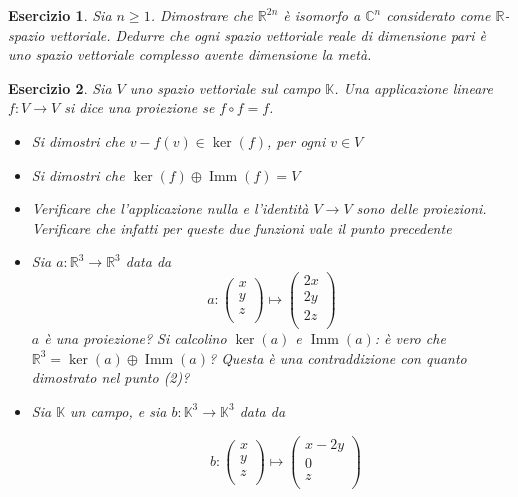 \documentclass{article}
\newtheorem{es}{Esercizio}
\begin{document}
{\begin{es}
    Sia $n\geq 1$. Dimostrare che $\mathbb{R}^{2n}$ è isomorfo a $\mathbb{C}^n$ considerato come $\mathbb{R}$-spazio vettoriale. Dedurre che ogni spazio vettoriale reale di dimensione pari è uno spazio vettoriale complesso avente dimensione la metà.
\end{es}


\begin{es}
    
    Sia $V$ uno spazio vettoriale sul campo $\mathbb{K}$. Una applicazione lineare $f:V\to V$ si dice una proiezione se $f\circ f=f$.
    \begin{itemize}
        \item [1.] Si dimostri che $v-f(v)\in \ker(f)$, per ogni $v\in V$
        \item [2.] Si dimostri che $\ker(f)\oplus \operatorname{Imm}(f)=V$
        \item [3.] Verificare che l'applicazione nulla e l'identità $V\to V$ sono delle proiezioni. Verificare che infatti per queste due funzioni vale il punto precedente
        \item [4.] Sia $a:\mathbb{R}^3\to \mathbb{R}^3$ data da
        $$a:\begin{pmatrix}
            x \\
            y \\
            z\\
        \end{pmatrix}\mapsto \begin{pmatrix}
            2x \\
            2y \\
            2z\\
        \end{pmatrix}$$
        $a$ è una proiezione? Si calcolino $\ker(a)$ e $\operatorname{Imm}(a)$: è vero che $\mathbb{R}^3=\ker(a)\oplus \operatorname{Imm}(a)$? Questa è una contraddizione con quanto dimostrato nel punto (2)?
        \item [5.] Sia $\mathbb{K}$ un campo, e sia $b:\mathbb{K}^3\to \mathbb{K}^3$ data da
        
        $$\qquad b:\begin{pmatrix}
            x \\
            y \\
            z\\
        \end{pmatrix}\mapsto \begin{pmatrix}
            x-2y \\
            0 \\
            z\\
        \end{pmatrix}$$ 


\end{itemize}
\end{es}}
\end{document}
